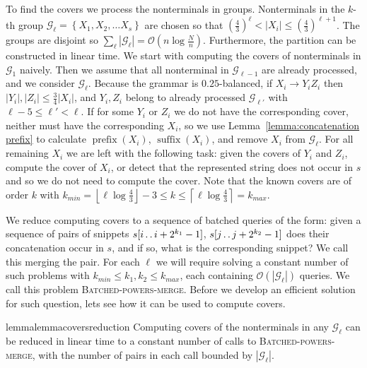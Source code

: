 \documentclass[runningheads]{llncs}
\DeclareMathOperator{\prefix}{prefix}
\DeclareMathOperator{\suffix}{suffix}
\newcommand{\twodots}{\mathinner{\ldotp\ldotp}}
\newcommand{\proc}[1]{\textnormal{\scshape#1}}
\begin{document}
To find the covers we process the nonterminals in groups. Nonterminals in the $k$-th group $\mathcal{G}_\ell = \left\{X_1,X_2,\ldots X_s \right\}$ are chosen so that $(\frac{4}{3})^\ell<|X_i|\leq(\frac{4}{3})^{\ell+1}$. The groups are disjoint so $\sum_\ell\left|\mathcal{G}_\ell\right|=\mathcal{O}(n\log\frac{N}{n})$. Furthermore, the partition can be constructed in linear time.
We start with computing the covers of nonterminals in $\mathcal{G}_1$ naively. Then we assume that all nonterminal in $\mathcal{G}_{\ell-1}$ are already processed, and we consider $\mathcal{G}_\ell$. Because the grammar is $0.25$-balanced, if $X_i\rightarrow Y_i Z_i$ then $|Y_i|,|Z_i|\leq\frac{3}{4}|X_i|$, and $Y_i, Z_i$ belong to already processed $\mathcal{G}_{\ell'}$ with $\ell-5 \leq\ell'<\ell$. If for some $Y_i$ or 	$Z_i$ we do not have the corresponding cover, neither must have the corresponding $X_i$, so we use Lemma~\ref{lemma:concatenation prefix} to calculate $\prefix(X_i)$, $\suffix(X_i)$, and remove $X_i$ from $\mathcal{G}_\ell$. For all remaining $X_i$ we are left with the following task: given the covers of $Y_i$ and $Z_i$, compute the cover of $X_i$, or detect that the represented string does not occur in $s$ and so we do not need to compute the cover. Note that the known covers are of order $k$ with $k_{min}=\left\lfloor\ell\log\frac{4}{3}\right\rfloor-3\leq k\leq\left\lceil\ell\log\frac{4}{3}\right\rceil=k_{max}$.

We reduce computing covers to a sequence of batched queries of the form: given a sequence of pairs of snippets $s[i\twodots i+2^{k_1}-1]$, $s[j\twodots j+2^{k_2}-1]$ does their concatenation occur in $s$, and if so, what is the corresponding snippet? We call this merging the pair. For each $\ell$ we will require solving a constant number of such problems with $k_{min}\leq k_1,k_2\leq k_{max}$, each containing $\mathcal{O}(|\mathcal{G}_\ell|)$ queries. We call this problem \proc{Batched-powers-merge}. Before we develop an efficient solution for such question, lets see how it can be used to compute covers.

\begin{restatable}{lemma}{lemmacoversreduction}
\label{lemma:covers reduction}
Computing covers of the nonterminals in any $\mathcal{G}_\ell$ can be reduced in linear time to a constant number of calls to \proc{Batched-powers-merge}, with the number of pairs in each call bounded by $\left|\mathcal{G}_\ell\right|$.
\end{restatable}
\end{document}
